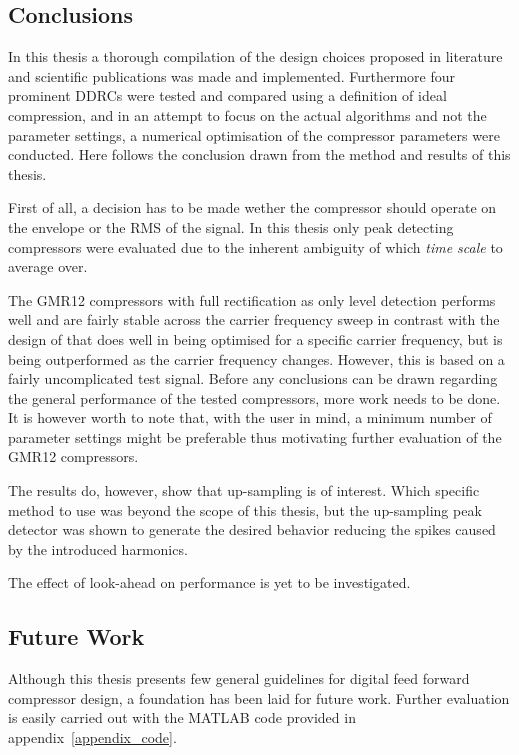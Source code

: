 \documentclass[../main2.tex]{subfiles}
\begin{document}
\subsection{Conclusions}\label{discussion_results}
In this thesis a thorough compilation of the design choices proposed in literature and scientific publications was made and implemented. Furthermore four prominent DDRCs were tested and compared using a definition of ideal compression, and in an attempt to focus on the actual algorithms and not the parameter settings, a numerical optimisation of the compressor parameters were conducted. Here follows the conclusion drawn from the method and results of this thesis.

First of all, a decision has to be made wether the compressor should operate on the envelope or the RMS of the signal. In this thesis only peak detecting compressors were evaluated due to the inherent ambiguity of which \emph{time scale} to average over. 

The GMR12 compressors with full rectification as only level detection performs well and are fairly stable across the carrier frequency sweep in contrast with the design of \cite{mcnally1984dynamic} that does well in being optimised for a specific carrier frequency, but is being outperformed as the carrier frequency changes. However, this is based on a fairly uncomplicated test signal. Before any conclusions can be drawn regarding the general performance of the tested compressors, more work needs to be done. It is however worth to note that, with the user in mind, a minimum number of parameter settings might be preferable thus motivating further evaluation of the GMR12 compressors.

The results do, however, show that up-sampling is of interest. Which specific method to use was beyond the scope of this thesis, but the up-sampling peak detector was shown to generate the desired behavior reducing the spikes caused by the introduced harmonics.

The effect of look-ahead on performance is yet to be investigated.

\subsection{Future Work}
Although this thesis presents few general guidelines for digital feed forward compressor design, a foundation has been laid for future work. Further evaluation is easily carried out with the MATLAB code provided in appendix~\ref{appendix_code}. 
\end{document}
